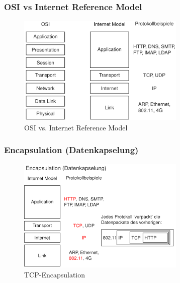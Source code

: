 \documentclass[10pt,a4paper]{article}
\begin{document}
\subsubsection*{OSI vs Internet Reference Model}
\begin{figure}[H]
    \begin{center}
    \includegraphics[width=8cm]{images/OSIvsIRM.png}
    \caption{OSI vs. Internet Reference Model}
    \label{OSIvsIRM}
    \end{center}
\end{figure}


\subsubsection*{Encapsulation (Datenkapselung)}
\begin{figure}[H]
    \begin{center}
    \includegraphics[width=8cm]{images/TCP-Encapsulation.png}
    \caption{TCP-Encapsulation}
    \label{TCP-Encapsulation}
    \end{center}
\end{figure}
\end{document}
